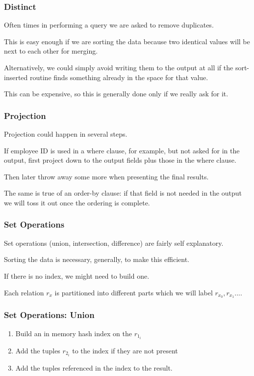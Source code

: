 \begin{frame}
\frametitle{Distinct}

Often times in performing a query we are asked to remove duplicates. 

This is easy enough if we are sorting the data because two identical values will be next to each other for merging. 

Alternatively, we could simply avoid writing them to the output at all if the sort-inserted routine finds something already in the space for that value. 

This can be expensive, so this is generally done only if we really ask for it.

\end{frame}

\begin{frame}
\frametitle{Projection}

Projection could happen in several steps. 

If employee ID is used in a where clause, for example, but not asked for in the output, first project down to the output fields plus those in the where clause.

Then later throw away some more when presenting the final results. 

The same is true of an order-by clause: if that field is not needed in the output we will toss it out once the ordering is complete.
\end{frame}

\begin{frame}
\frametitle{Set Operations}

Set operations (union, intersection, difference) are fairly self explanatory. 

Sorting the data is necessary, generally, to make this efficient. 

If there is no index, we might need to build one. 

Each relation $r_{x}$ is partitioned into different parts which we will label $r_{x_{0}}, r_{x_{1}}...$. 

\end{frame}

\begin{frame}
\frametitle{Set Operations: Union}

\begin{enumerate}
		\item Build an in memory hash index on the $r_{1_{i}}$
		\item Add the tuples $r_{2_{i}}$ to the index if they are not present
		\item Add the tuples referenced in the index to the result.
	\end{enumerate}

\end{frame}

